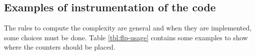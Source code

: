 
\subsection{Examples of instrumentation of the code}
The rules to compute the complexity are general and when they are 
implemented, some choices must be done. Table \ref{tbl:flp-usage}
contains some examples to show where the counters should be placed.

